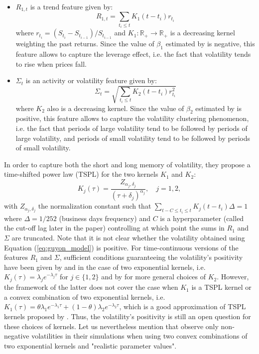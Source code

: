 \begin{itemize}
    \item $R_{1,t}$ is a trend feature given by:
\begin{equation}\label{eq:r1_formula}
    R_{1,t} = \sum_{t_i \le t} K_1(t-t_i) r_{t_i}
\end{equation}
where $r_{t_i}= (S_{t_i}-S_{t_{i-1}})/S_{t_{i-1}}$ and $K_1:\mathbb{R}_+\rightarrow \mathbb{R}_+$ is a decreasing kernel weighting the past returns. Since the value of $\beta_1$ estimated by \cite{guyon2022volatility} is negative, this feature allows to capture the leverage effect, i.e. the fact that volatility tends to rise when prices fall.
\item $\Sigma_t$ is an activity or volatility feature given by:
\begin{equation}\label{eq:sigma_formula}
    \Sigma_t = \sqrt{\sum_{t_i \le t} K_2(t-t_i) r_{t_i}^2}
\end{equation}
where $K_2$ also is a decreasing kernel. Since the value of $\beta_2$ estimated by \cite{guyon2022volatility} is positive, this feature allows to capture the volatility clustering phenomenon, i.e. the fact that periods of large volatility tend to be followed by periods of large volatility, and periods of small volatility tend to be followed by periods of small volatility. 
\end{itemize}
In order to capture both the short and long memory of volatility, they propose a time-shifted power law (TSPL) for the two kernels $K_1$ and $K_2$:
\begin{equation}\label{eq:tspl_kernel}
    K_j(\tau) = \frac{Z_{\alpha_j,\delta_j}}{(\tau+\delta_j)^{\alpha_j}},\quad j=1,2,
\end{equation}
with $Z_{\alpha_j,\delta_j}$ the normalization constant such that $\sum_{t-C\le t_i \le t} K_j(t-t_i)\Delta  = 1$ where $\Delta  = 1/252$ (business days frequency) and $C$ is a hyperparameter (called the cut-off lag later in the paper) controlling at which point the sums in $R_1$ and $\Sigma$ are truncated. Note that it is not clear whether the volatility obtained using Equation (\ref{eq:guyon_model}) is positive. For time-continuous versions of the features $R_1$ and $\Sigma$, sufficient conditions guaranteeing the volatility's positivity have been given by \cite{guyon2022volatility} and \cite{nutz2024} in the case of two exponential kernels, i.e. $K_j(\tau) = \lambda_j e^{-\lambda_j\tau}$ for $j\in\{1,2\}$ and by \cite{andres2024existence} for more general choices of $K_2$. However, the framework of the latter does not cover the case when $K_1$ is a TSPL kernel or a convex combination of two exponential kernels, i.e. $K_1(\tau)=\theta \lambda_{1}e^{-\lambda_{1}\tau}+(1-\theta)\lambda_{2}e^{-\lambda_{2}\tau}$, which is a good approximation of TSPL kernels proposed by \citeauthor{guyon2022volatility}. Thus, the volatility's positivity is still an open question for these choices of kernels. Let us nevertheless mention that \citeauthor{guyon2022volatility} observe only non-negative volatilities in their simulations when using two convex combinations of two exponential kernels and "realistic parameter values".   \\

